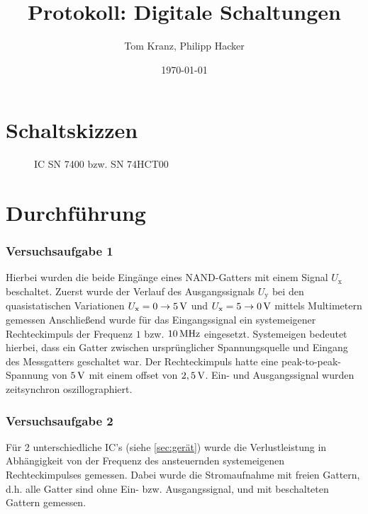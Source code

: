 \documentclass[numbers=noenddot,12pt,a4paper]{scrartcl}
\title{Protokoll: Digitale Schaltungen}
\author{Tom Kranz, Philipp Hacker}
\date{\today}
\newcommand{\ix}[1]{_\text{#1}}
\begin{document}
\maketitle
\vspace*{\fill}
\tableofcontents
\vfill
\newpage
\section{Schaltskizzen}
\begin{figure}[H]
\centering
\caption{IC SN 7400 bzw. SN 74HCT00} \label{img:ic}
\end{figure}
\section{Durchführung}
\subsubsection{Versuchsaufgabe 1}
Hierbei wurden die beide Eingänge eines NAND-Gatters mit einem Signal $U\ix{x}$ beschaltet. Zuerst wurde der Verlauf des Ausgangssignals $U\ix{y}$ bei den quasistatischen Variationen $U\ix{x}=0\rightarrow\unit[5]{V}$ und $U\ix{x}=5\rightarrow\unit[0]{V}$ mittels Multimetern gemessen Anschließend wurde für das Eingangssignal ein systemeigener Rechteckimpuls der Frequenz $1$ bzw. $\unit[10]{MHz}$ eingesetzt. Systemeigen bedeutet hierbei, dass ein Gatter zwischen ursprünglicher Spannungsquelle und Eingang des Messgatters geschaltet war. Der Rechteckimpuls hatte eine peak-to-peak-Spannung von $\unit[5]{V}$ mit einem offset von $\unit[2,5]{V}$. Ein- und Ausgangssignal wurden zeitsynchron oszillographiert.
\subsubsection{Versuchsaufgabe 2}
Für 2 unterschiedliche IC's (siehe \ref{sec:gerät}) wurde die Verlustleistung in Abhängigkeit von der Frequenz des ansteuernden systemeigenen Rechteckimpulses gemessen. Dabei wurde die Stromaufnahme mit freien Gattern, d.h. alle Gatter sind ohne Ein- bzw. Ausgangssignal, und mit beschalteten Gattern gemessen.
\end{document}
